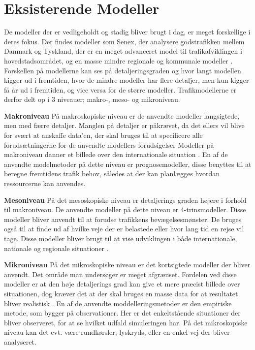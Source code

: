 \section{Eksisterende Modeller}
De modeller der er vedligeholdt og stadig bliver brugt i dag, er meget forskellige i deres fokus. Der findes modeller som Senex, der analysere godstrafikken mellem Danmark og Tyskland, der er en meget advanceret model til trafikafviklingen i hovedstadsområdet, og en masse mindre regionale og kommunale modeller \cite[s. 2]{dtfnotat}. Forskellen på modellerne kan ses på detaljeringsgraden og hvor langt modellen kigger ud i fremtiden, hvor de mindre modeller har flere detaljer, men kun kigger få år ud i fremtiden, og vice versa for de større modeller. Trafikmodellerne er derfor delt op i 3 niveauer; makro-, meso- og mikroniveau.

\vspace{5mm}

\textbf{Makroniveau} På makroskopiske niveau er de anvendte modeller langsigtede, men med færre detaljer. Manglen på detaljer er påkrævet, da det ellers vil blive for svært at anskaffe data’en, der skal bruges til at specificere alle forudsætningerne for de anvendte modellers forudsigelser \cite[s. 1]{dtfnotat} Modeller på makroniveau danner et billede over den internationale situation \cite[s. 9]{dtfnotat}. En af de anvendte modelmetoder på dette niveau er prognosemodeller, disse benyttes til at beregne fremtidens trafik behov, således at der kan planlægges hvordan ressourcerne kan anvendes.\cite{TrafiksimuleringVisSim}


\vspace{5mm}

\textbf{Mesoniveau} På det mesoskopiske niveau er detaljerings graden højere i forhold til makroniveau. De anvendte modeller på dette niveau er 4-trinsmodeller. Disse modeller bliver anvendt til at forudse trafikkens bevægelsesmønster.\cite{TrafiksimuleringVisSim} De bruges også til at finde ud af hvilke veje der er belastede eller hvor lang tid en rejse vil tage. Disse modeller bliver brugt til at vise udviklingen i både internationale, nationale og regionale situationer \cite[s. 9]{dtfnotat}.

\vspace{5mm}

\textbf{Mikroniveau} På det mikroskopiske niveau er det kortsigtede modeller der bliver anvendt. Det område man undersøger er meget afgrænset. Fordelen ved disse modeller er at den høje detaljerings grad kan give et mere præcist billede over situationen, dog kræver det at der skal bruges en masse data for at resultatet bliver realistisk \cite[s. 9]{dtfnotat}. En af de anvendte moddelleringsmetoder er den empiriske metode, som bygger på observationer. Her er det enkeltstående situationer der bliver observeret, for at se hvilket udfald simuleringen har. På det mikroskopiske niveau kan det evt. være rundkørsler, lyskryds, eller en enkel vej der bliver analyseret.\cite{TrafiksimuleringVisSim}

